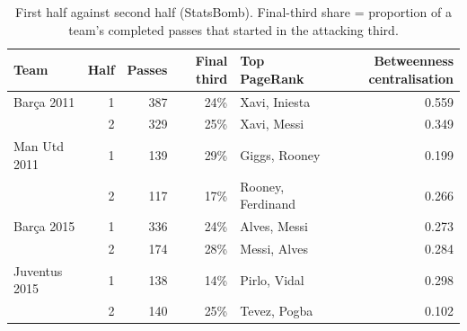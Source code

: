 \begin{table}[t]
\centering\small
\caption{First half against second half (StatsBomb). Final-third share = proportion of a team's completed passes that started in the attacking third.}
\label{tab:halves}
\begin{tabular}{lrrrlr}
\toprule
Team & Half & Passes & Final third & Top PageRank & Betweenness centralisation \\
\midrule
Barça 2011 & 1 & 387 & 24\% & Xavi, Iniesta & 0.559 \\
 & 2 & 329 & 25\% & Xavi, Messi & 0.349 \\
Man Utd 2011 & 1 & 139 & 29\% & Giggs, Rooney & 0.199 \\
 & 2 & 117 & 17\% & Rooney, Ferdinand & 0.266 \\
Barça 2015 & 1 & 336 & 24\% & Alves, Messi & 0.273 \\
 & 2 & 174 & 28\% & Messi, Alves & 0.284 \\
Juventus 2015 & 1 & 138 & 14\% & Pirlo, Vidal & 0.298 \\
 & 2 & 140 & 25\% & Tevez, Pogba & 0.102 \\
\bottomrule
\end{tabular}
\end{table}
